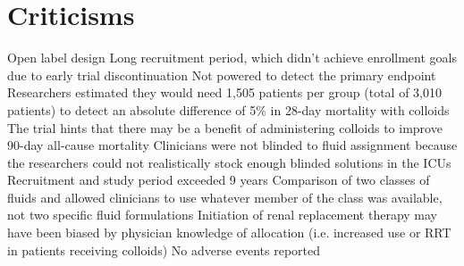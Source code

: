 \documentclass{beamer}
\begin{document}
\section{Criticisms}
Open label design
Long recruitment period, which didn't achieve enrollment goals due to early trial discontinuation
Not powered to detect the primary endpoint
Researchers estimated they would need 1,505 patients per group (total of 3,010 patients) to detect an absolute difference of 5\% in 28-day mortality with colloids
The trial hints that there may be a benefit of administering colloids to improve 90-day all-cause mortality
Clinicians were not blinded to fluid assignment because the researchers could not realistically stock enough blinded solutions in the ICUs
Recruitment and study period exceeded 9 years
Comparison of two classes of fluids and allowed clinicians to use whatever member of the class was available, not two specific fluid formulations
Initiation of renal replacement therapy may have been biased by physician knowledge of allocation (i.e. increased use or RRT in patients receiving colloids)
No adverse events reported
\end{document}
